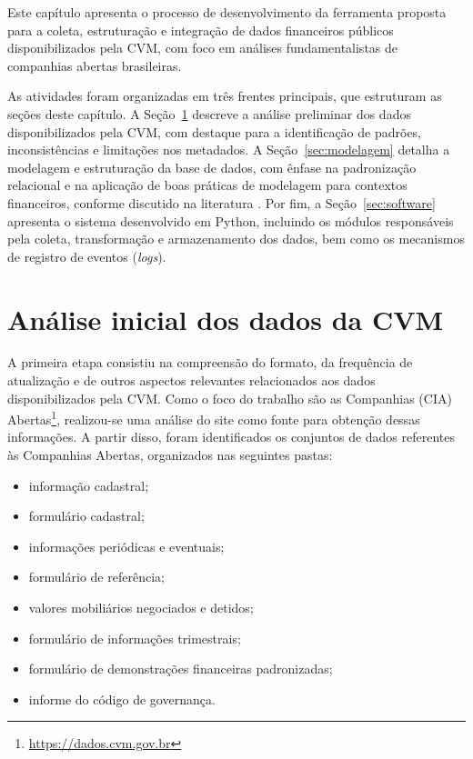 Este capítulo apresenta o processo de desenvolvimento da ferramenta proposta para a coleta, estruturação e integração de dados financeiros públicos disponibilizados pela CVM, com foco em análises fundamentalistas de companhias abertas brasileiras.

As atividades foram organizadas em três frentes principais, que estruturam as seções deste capítulo. A Seção~\ref{sec:analise_cvm} descreve a análise preliminar dos dados disponibilizados pela CVM, com destaque para a identificação de padrões, inconsistências e limitações nos metadados. A Seção~\ref{sec:modelagem} detalha a modelagem e estruturação da base de dados, com ênfase na padronização relacional e na aplicação de boas práticas de modelagem para contextos financeiros, conforme discutido na literatura \cite{elmasri:2016:fundamentals}. Por fim, a Seção~\ref{sec:software} apresenta o sistema desenvolvido em Python, incluindo os módulos responsáveis pela coleta, transformação e armazenamento dos dados, bem como os mecanismos de registro de eventos (\textit{logs}).


\section{Análise inicial dos dados da CVM} \label{sec:analise_cvm}

A primeira etapa consistiu na compreensão do formato, da frequência de atualização e de outros aspectos relevantes relacionados aos dados disponibilizados pela CVM. Como o foco do trabalho são as Companhias (CIA) Abertas\footnote{\url{https://dados.cvm.gov.br}}, realizou-se uma análise do site como fonte para obtenção dessas informações. A partir disso, foram identificados os conjuntos de dados referentes às Companhias Abertas, organizados nas seguintes pastas:

\begin{itemize}
	\item informação cadastral;
	\item formulário cadastral;
	\item informações periódicas e eventuais;
	\item formulário de referência;
	\item valores mobiliários negociados e detidos;
	\item formulário de informações trimestrais;
	\item formulário de demonstrações financeiras padronizadas;
	\item informe do código de governança.
\end{itemize}

